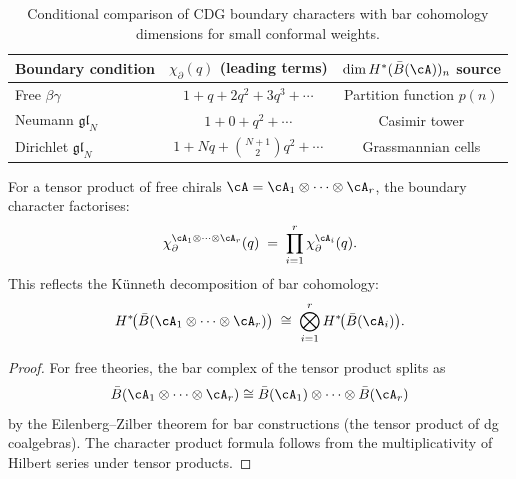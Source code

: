 \begin{table}[ht]
\centering
\caption{Conditional comparison of CDG boundary characters with bar cohomology
 dimensions for small conformal weights.}
\label{tab:boundary-characters-bar}
\renewcommand{\arraystretch}{1.2}
\begin{tabular}{lcc}
\toprule
Boundary condition & $\chi_\partial(q)$ (leading terms)
 & $\dim H^*(\bar{B}(\cA))_n$ source \\
\midrule
Free $\beta\gamma$ & $1 + q + 2q^2 + 3q^3 + \cdots$
 & Partition function $p(n)$ \\
Neumann $\mathfrak{gl}_N$ & $1 + 0 + q^2 + \cdots$
 & Casimir tower \\
Dirichlet $\mathfrak{gl}_N$ & $1 + Nq + \binom{N+1}{2}q^2 + \cdots$
 & Grassmannian cells \\
\bottomrule
\end{tabular}
\end{table}

\begin{proposition}
\label{prop:multi-chiral-product-characters}
For a tensor product of free chirals $\cA = \cA_1 \otimes \cdots
\otimes \cA_r$, the boundary character factorises:
\begin{equation}\label{eq:multi-chiral-product}
 \chi_\partial^{\cA_1 \otimes \cdots \otimes \cA_r}(q)
 \;=\;
 \prod_{i=1}^{r}
 \chi_\partial^{\cA_i}(q).
\end{equation}
This reflects the K\"unneth decomposition of bar cohomology:
\[
 H^*\!\bigl(\bar{B}(\cA_1 \otimes \cdots \otimes \cA_r)\bigr)
 \;\cong\;
 \bigotimes_{i=1}^{r}
 H^*\!\bigl(\bar{B}(\cA_i)\bigr).
\]
\end{proposition}

\begin{proof}
For free theories, the bar complex of the tensor product splits as
\[
\bar{B}(\cA_1 \otimes \cdots \otimes \cA_r)
\cong
\bar{B}(\cA_1) \otimes \cdots \otimes \bar{B}(\cA_r)
\]
by the Eilenberg--Zilber theorem for bar constructions (the tensor
product of dg coalgebras). The character product formula follows from
the multiplicativity of Hilbert series under tensor products.
\end{proof}

